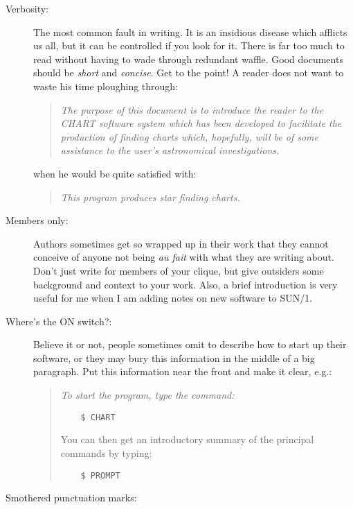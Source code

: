 \documentclass[twoside,11pt]{article}
\begin{document}
\begin{description}

\item [Verbosity:]

The most common fault in writing.
It is an insidious disease which afflicts us all, but it can be controlled if
you look for it.
There is far too much to read without having to wade through redundant waffle.
Good documents should be {\em short}\/ and {\em concise}.
Get to the point!
A reader does not want to waste his time ploughing through:
\begin{quote}
{\em The purpose of this document is to introduce the reader to the CHART
software system which has been developed to facilitate the production of
finding charts which, hopefully, will be of some assistance to the user's
astronomical investigations.}
\end{quote}
when he would be quite satisfied with:
\begin{quote}
{\em This program produces star finding charts.}
\end{quote}

\item [Members only:]

Authors sometimes get so wrapped up in their work that they cannot conceive
of anyone not being {\em au fait}\/ with what they are writing about.
Don't just write for members of your clique, but give outsiders some background
and context to your work.
Also, a brief introduction is very useful for me when I am adding notes on new
software to SUN/1.

\item [Where's the ON switch?:]

Believe it or not, people sometimes omit to describe how to start up their
software, or they may bury this information in the middle of a big paragraph.
Put this information near the front and make it clear, e.g.:
\begin{quote}
{\em To start the program, type the command:
\begin{verbatim}
    $ CHART
\end{verbatim}
You can then get an introductory summary of the principal commands by typing:
\begin{verbatim}
    $ PROMPT
\end{verbatim}}
\end{quote}

\item [Smothered punctuation marks:]


\end{description}
\end{document}
